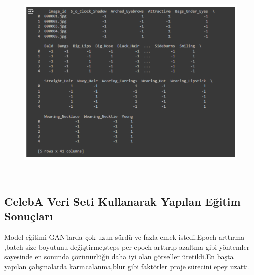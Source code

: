 \documentclass[12pt]{article}
\begin{document}
\begin{figure}[h]
    \centering
    \includegraphics[width=7\textwidth, height=10cm, keepaspectratio]{rsnt.png}
    \label{fig:enter-label}
\end{figure}
\subsection{CelebA Veri Seti Kullanarak Yapılan Eğitim Sonuçları}
Model eğitimi GAN'larda çok uzun sürdü ve fazla emek istedi.Epoch arttırma ,batch size boyutunu değiştirme,steps per epoch arttırıp azaltma gibi yöntemler sayesinde en sonunda çözünürlüğü daha iyi olan görseller üretildi.En başta yapılan çalışmalarda karıncalanma,blur gibi faktörler proje sürecini epey uzattı.
\newline
\end{document}
